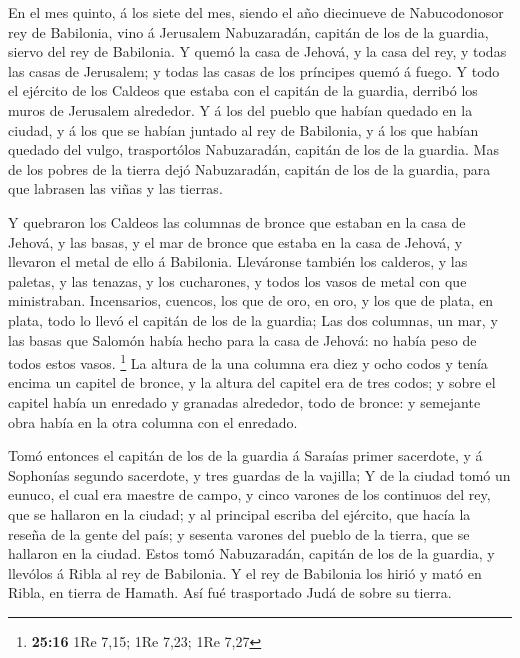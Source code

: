  En el mes quinto, á los siete del mes, siendo el año
diecinueve de Nabucodonosor rey de Babilonia, vino á Jerusalem
Nabuzaradán, capitán de los de la guardia, siervo del rey de Babilonia.
 Y quemó la casa de Jehová, y la casa del rey, y todas las
casas de Jerusalem; y todas las casas de los príncipes quemó á fuego.
 Y todo el ejército de los Caldeos que estaba con el
capitán de la guardia, derribó los muros de Jerusalem alrededor.
 Y á los del pueblo que habían quedado en la ciudad, y á
los que se habían juntado al rey de Babilonia, y á los que habían
quedado del vulgo, trasportólos Nabuzaradán, capitán de los de la
guardia.  Mas de los pobres de la tierra dejó
Nabuzaradán, capitán de los de la guardia, para que labrasen las viñas y
las tierras.

 Y quebraron los Caldeos las columnas de bronce que
estaban en la casa de Jehová, y las basas, y el mar de bronce que estaba
en la casa de Jehová, y llevaron el metal de ello á Babilonia.
 Lleváronse también los calderos, y las paletas, y las
tenazas, y los cucharones, y todos los vasos de metal con que
ministraban.  Incensarios, cuencos, los que de oro, en
oro, y los que de plata, en plata, todo lo llevó el capitán de los de la
guardia;  Las dos columnas, un mar, y las basas que
Salomón había hecho para la casa de Jehová: no había peso de todos estos
vasos. \footnote{\textbf{25:16} 1Re 7,15; 1Re 7,23; 1Re 7,27}
 La altura de la una columna era diez y ocho codos y
tenía encima un capitel de bronce, y la altura del capitel era de tres
codos; y sobre el capitel había un enredado y granadas alrededor, todo
de bronce: y semejante obra había en la otra columna con el enredado.

 Tomó entonces el capitán de los de la guardia á Saraías
primer sacerdote, y á Sophonías segundo sacerdote, y tres guardas de la
vajilla;  Y de la ciudad tomó un eunuco, el cual era
maestre de campo, y cinco varones de los continuos del rey, que se
hallaron en la ciudad; y al principal escriba del ejército, que hacía la
reseña de la gente del país; y sesenta varones del pueblo de la tierra,
que se hallaron en la ciudad.  Estos tomó Nabuzaradán,
capitán de los de la guardia, y llevólos á Ribla al rey de Babilonia.
 Y el rey de Babilonia los hirió y mató en Ribla, en
tierra de Hamath. Así fué trasportado Judá de sobre su tierra.

